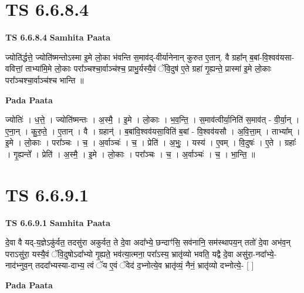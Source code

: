 \documentclass[17pt]{extarticle}
\begin{document}

\section{ TS 6.6.8.4 }

\textbf{TS 6.6.8.4 } \newline
\textbf{Samhita Paata} \newline

ज्योति॑र्द्धत्ते॒ ज्योति॑ष्मन्तोऽस्मा इ॒मे लो॒का भ॑वन्ति स॒माव॑द्-वीर्यानेनान् कुरुत ए॒तान्. वै ग्रहा᳚न् ब॒बां-वि॒श्वव॑यसा-ववित्तां॒ ताभ्या॑मि॒मे लो॒काः परा᳚ञ्चश्चा॒र्वाञ्च॑श्च॒ प्राभु॒र्यस्यै॒वं ॅवि॒दुष॑ ए॒ते ग्रहा॑ गृ॒ह्यन्ते॒ प्रास्मा॑ इ॒मे लो॒काः परा᳚ञ्चश्चा॒र्वाञ्च॑श्च भान्ति ॥ \newline

\textbf{Pada Paata} \newline

ज्योतिः॑ । ध॒त्ते॒ । ज्योति॑ष्मन्तः । अ॒स्मै॒ । इ॒मे । लो॒काः । भ॒व॒न्ति॒ । स॒माव॑त्वीर्या॒निति॑ स॒माव॑त् - वी॒र्या॒न् । ए॒ना॒न् । कु॒रु॒ते॒ । ए॒तान् । वै । ग्रहान्॑ । ब॒बांवि॒श्वव॑यसा॒विति॑ ब॒बां - वि॒श्वव॑यसौ । अ॒वि॒त्ता॒म् । ताभ्या᳚म् । इ॒मे । लो॒काः । परा᳚ञ्चः । च॒ । अ॒र्वाञ्चः॑ । च॒ । प्रेति॑ । अ॒भुः॒ । यस्य॑ । ए॒वम् । वि॒दुषः॑ । ए॒ते । ग्रहाः᳚ । गृ॒ह्यन्ते᳚ । प्रेति॑ । अ॒स्मै॒ । इ॒मे । लो॒काः । परा᳚ञ्चः । च॒ । अ॒र्वाञ्चः॑ । च॒ । भा॒न्ति॒ ॥  \newline





\section{ TS 6.6.9.1 }

\textbf{TS 6.6.9.1 } \newline
\textbf{Samhita Paata} \newline

दे॒वा वै यद्-य॒ज्ञेऽकु॑र्वत॒ तदसु॑रा अकुर्वत॒ ते दे॒वा अदा᳚भ्ये॒ छन्दाꣳ॑सि॒ सव॑नानि॒ सम॑स्थापय॒न् ततो॑ दे॒वा अभ॑व॒न् पराऽसु॑रा॒ यस्यै॒वं ॅवि॒दुषोऽदा᳚भ्यो गृ॒ह्यते॒ भव॑त्या॒त्मना॒ परा᳚ऽस्य॒ भ्रातृ॑व्यो भवति॒ यद्वै दे॒वा असु॑रा॒-नदा᳚भ्ये॒-नाद॑भ्नुव॒न् तददा᳚भ्यस्या-दाभ्य॒ त्वं ॅय ए॒वं ॅवेद॑ द॒भ्नोत्ये॒व भ्रातृ॑व्यं॒ नैनं॒ भ्रातृ॑व्यो दभ्नोत्ये॒- [  ] \newline

\textbf{Pada Paata} \newline
\end{document}
